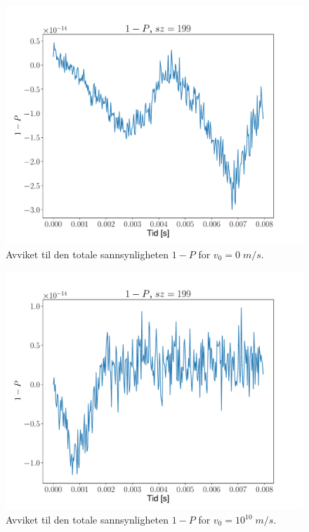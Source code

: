 \documentclass[reprint,english,notitlepage]{revtex4-2}  %
\begin{document}
\begin{figure}
	\centering
	\includegraphics[scale=0.4, trim={2cm 0 0 0}]{../Images/7P199.pdf}
	\caption{Avviket til den totale sannsynligheten $1 - P$ for $v_0 = 0 \; m/s$.}
	\label{Fig:ToTP}
\end{figure}

\begin{figure}
	\centering
	\includegraphics[scale=0.4, trim={2cm 0 0 0}]{../Images/7s1P199.pdf}
	\caption{Avviket til den totale sannsynligheten $1 - P$ for $v_0 = 10^10 \; m/s$.}
	\label{Fig:ToTPs1}
\end{figure}
\end{document}

